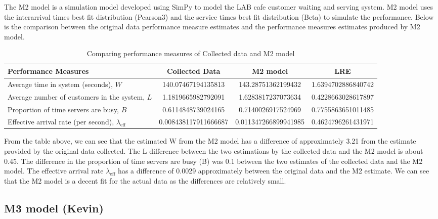\documentclass{article}
\begin{document}
The M2 model is a simulation model developed using SimPy to model the LAB cafe customer waiting and serving system. M2 model uses the interarrival times best fit distribution (Pearson3) and the service times best fit distribution (Beta) to simulate the performance. Below is the comparison between the original data performance measure estimates and the performance measures estimates produced by M2 model.

\begin{table}[H]
    \centering
    \caption{Comparing performance measures of Collected data and M2 model}
    \begin{tabu}{X S S S}
        \toprule
        \textbf{Performance Measures} & \textbf{Collected Data} & \textbf{M2 model}& \textbf{LRE}\\
        \midrule
        Average time in system (seconds), $W$ & 140.07467194135813 & 143.28751362199432 & 1.6394702886840742\\
        Average number of customers in the system, $L$ & 1.1819665982792091 & 1.6283817237073634 & 0.4228663028617897\\
        Proportion of time servers are busy, $B$ & 0.6114848739024165 & 0.7140026917524969 & 0.7755863651011485\\
        Effective arrival rate (per second), $\lambda_{\text{eff}}$ & 0.008438117911666687 & 0.011347266899941985 & 0.4624796261431971\\
        \bottomrule
    \end{tabu}
    \label{tab:M2}
\end{table}

From the table above, we can see that the estimated W from the M2 model has a difference of approximately 3.21 from the estimate provided by the original data collected. The L difference between the two estimations by the collected data and the M2 model is about 0.45. The difference in the proportion of time servers are busy (B) was 0.1 between the two estimates of the collected data and the M2 model. The effective arrival rate $\lambda_{\text{eff}}$ has a difference of 0.0029 approximately between the original data and the M2 estimate. We can see that the M2 model is a decent fit for the actual data as the differences are relatively small.



\subsection{M3 model (Kevin)}
\end{document}
